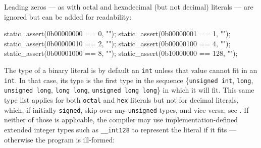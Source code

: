 \noindent Leading zeros --- as with octal and hexadecimal (but not decimal)
literals --- are ignored but can be added for readability:

\begin{emcppslisting}
static_assert(0b00000000 ==   0, "");
static_assert(0b00000001 ==   1, "");
static_assert(0b00000010 ==   2, "");
static_assert(0b00000100 ==   4, "");
static_assert(0b00001000 ==   8, "");
static_assert(0b10000000 == 128, "");
\end{emcppslisting}


\noindent The type of a binary literal
is by
default an \lstinline!int! unless that value cannot fit in an
\lstinline!int!. In that case, its type is the first type in the sequence
\{\lstinline!unsigned!~\lstinline!int!, %
 \lstinline!long!,
 \lstinline!unsigned!~\lstinline!long!, \lstinline!long!~\lstinline!long!,
\lstinline!unsigned!~\lstinline!long!~\lstinline!long!\} in which it will fit. This
same type list applies for both \lstinline!octal! and \lstinline!hex!
literals but not for decimal literals, which, if initially
\lstinline!signed!, skip over any \lstinline!unsigned! types, and vice versa;
see .
  If neither of those is applicable, the compiler may use implementation-defined extended integer types such as \lstinline!__int128! to represent the literal if it fits --- otherwise the program is ill-formed:


